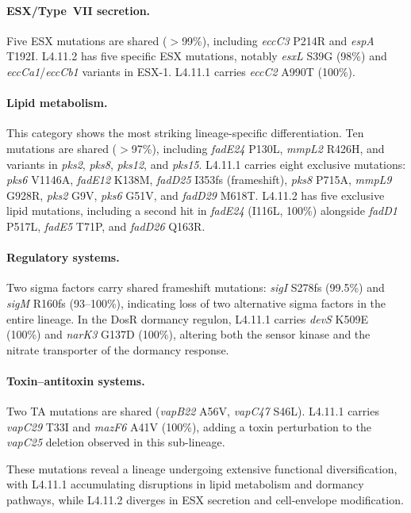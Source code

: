 \documentclass[11pt,a4paper]{article}
\newcommand{\lignee}[1]{\textsf{#1}}
\begin{document}
\paragraph{ESX/Type~VII secretion.}
Five ESX mutations are shared ($>$99\%), including \textit{eccC3} P214R and
\textit{espA} T192I.  \lignee{L4.11.2} has five specific ESX mutations,
notably \textit{esxL} S39G (98\%) and \textit{eccCa1}/\textit{eccCb1} variants in ESX-1.
\lignee{L4.11.1} carries \textit{eccC2} A990T (100\%).

\paragraph{Lipid metabolism.}
This category shows the most striking lineage-specific differentiation.
Ten mutations are shared ($>$97\%), including \textit{fadE24} P130L, \textit{mmpL2} R426H,
and variants in \textit{pks2}, \textit{pks8}, \textit{pks12}, and \textit{pks15}.  \lignee{L4.11.1} carries
eight exclusive mutations: \textit{pks6} V1146A, \textit{fadE12} K138M,
\textit{fadD25} I353fs (frameshift), \textit{pks8} P715A, \textit{mmpL9} G928R,
\textit{pks2} G9V, \textit{pks6} G51V, and \textit{fadD29} M618T.  \lignee{L4.11.2} has five
exclusive lipid mutations, including a second hit in \textit{fadE24}
(I116L, 100\%) alongside \textit{fadD1} P517L, \textit{fadE5} T71P, and \textit{fadD26} Q163R.

\paragraph{Regulatory systems.}
Two sigma factors carry shared frameshift mutations:
\textit{sigI} S278fs (99.5\%) and \textit{sigM} R160fs (93--100\%),
indicating loss of two alternative sigma factors in the entire lineage.
In the DosR dormancy regulon, \lignee{L4.11.1} carries
\textit{devS} K509E (100\%) and \textit{narK3} G137D (100\%), altering both the
sensor kinase and the nitrate transporter of the dormancy response.

\paragraph{Toxin--antitoxin systems.}
Two TA mutations are shared (\textit{vapB22} A56V, \textit{vapC47} S46L).
\lignee{L4.11.1} carries \textit{vapC29} T33I and \textit{mazF6} A41V (100\%),
adding a toxin perturbation to the \textit{vapC25} deletion observed in this
sub-lineage.

These mutations reveal a lineage undergoing extensive functional
diversification, with \lignee{L4.11.1} accumulating disruptions in lipid
metabolism and dormancy pathways, while \lignee{L4.11.2} diverges in
ESX secretion and cell-envelope modification.
\end{document}
